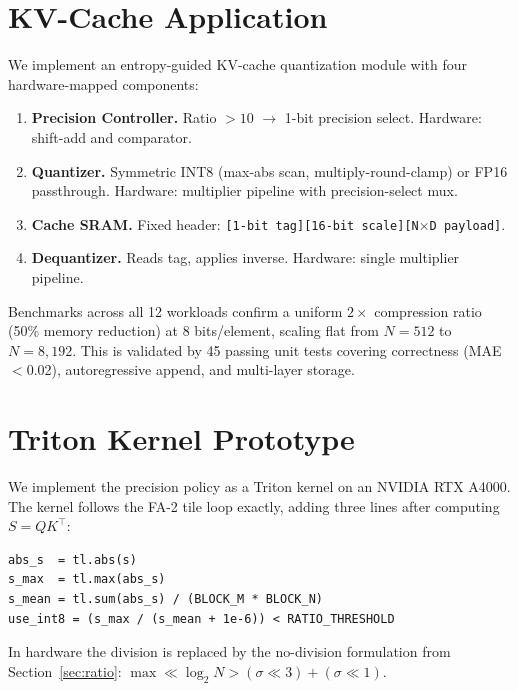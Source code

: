 \documentclass[10pt,twocolumn]{article}
\begin{document}
\section{KV-Cache Application}

We implement an entropy-guided KV-cache quantization module with four
hardware-mapped components:

\begin{enumerate}
  \item \textbf{Precision Controller.} Ratio $> 10$ $\rightarrow$
    1-bit precision select. Hardware: shift-add and comparator.
  \item \textbf{Quantizer.} Symmetric INT8 (max-abs scan,
    multiply-round-clamp) or FP16 passthrough. Hardware: multiplier
    pipeline with precision-select mux.
  \item \textbf{Cache SRAM.} Fixed header:
    \texttt{[1-bit tag][16-bit scale][N$\times$D payload]}.
  \item \textbf{Dequantizer.} Reads tag, applies inverse. Hardware:
    single multiplier pipeline.
\end{enumerate}

Benchmarks across all 12 workloads confirm a uniform $2\times$
compression ratio (50\% memory reduction) at 8 bits/element, scaling
flat from $N=512$ to $N=8{,}192$. This is validated by 45 passing unit
tests covering correctness (MAE $<$0.02), autoregressive append, and
multi-layer storage.

\section{Triton Kernel Prototype}

We implement the precision policy as a Triton kernel on an NVIDIA RTX
A4000. The kernel follows the FA-2 tile loop exactly, adding three
lines after computing $S = QK^\top$:

\begin{lstlisting}[caption={Precision decision inside the Triton tile loop (software).}]
abs_s  = tl.abs(s)
s_max  = tl.max(abs_s)
s_mean = tl.sum(abs_s) / (BLOCK_M * BLOCK_N)
use_int8 = (s_max / (s_mean + 1e-6)) < RATIO_THRESHOLD
\end{lstlisting}

In hardware the division is replaced by the no-division formulation
from Section~\ref{sec:ratio}: $\max \ll \log_2 N > (\sigma \ll 3) + (\sigma \ll 1)$.
\end{document}
